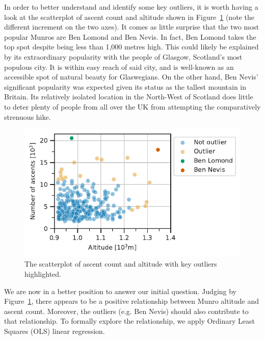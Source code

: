 \documentclass[11pt,a4paper]{article}
\begin{document}
In order to better understand and identify some key outliers, it is worth having a look at the scatterplot of ascent count and altitude shown in Figure~\ref{fds-project-template:fig:scatterplot} (note the different increment on the two axes). It comes as little surprise that the two most popular Munros are Ben Lomond and Ben Nevis. In fact, Ben Lomond takes the top spot despite being less than 1,000 metres high. This could likely be explained by its extraordinary popularity with the people of Glasgow, Scotland's most populous city. It is within easy reach of said city, and is well-known as an accessible spot of natural beauty for Glaswegians. On the other hand, Ben Nevis' significant popularity was expected given its status as the tallest mountain in Britain. Its relatively isolated location in the North-West of Scotland does little to deter plenty of people from all over the UK from attempting the comparatively strenuous hike.

\begin{figure} [h!]
  \centering
  \includegraphics{report/scatterplot.pdf}
  \caption{The scatterplot of ascent count and altitude with key outliers highlighted.}
  \label{fds-project-template:fig:scatterplot}
\end{figure}

We are now in a better position to answer our initial question. Judging by Figure~\ref{fds-project-template:fig:scatterplot}, there appears to be a positive relationship between Munro altitude and ascent count. Moreover, the outliers (e.g. Ben Nevis) should also contribute to that relationship. To formally explore the relationship, we apply Ordinary Least Squares (OLS) linear regression. 
\end{document}
